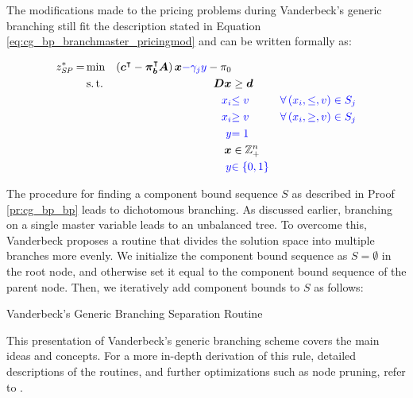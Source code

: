 \begin{note}
The modifications made to the pricing problems during Vanderbeck's generic branching still fit the description stated in Equation \eqref{eq:cg_bp_branchmaster_pricingmod} and can be written formally as:

\begin{equation}
\begin{aligned}
z^*_\SP{} = &\min & \left( \vec{c}\transpose - \vec{\pi}_\vec{b}\transpose \mat{A} \right) \vec{x} {\color{blue} - \gamma_j y} - \pi_0 & \\
&\st & \mat{D} \vec{x} & \geq \vec{d} \\
&& {\color{blue} x_i} & {\color{blue} \leq v} & {\color{blue} \forall \left( x_i, \leq, v \right) \in S_j} \\
&& {\color{blue} x_i} & {\color{blue} \geq v} & {\color{blue} \forall \left( x_i, \geq, v \right) \in S_j} \\
&& {\color{blue} y} & {\color{blue} = 1} \\
&& \vec{x} & \in \mathbb{Z}_+^n \\
&& {\color{blue} y} & {\color{blue} \in \{0, 1\}}
\end{aligned}
\end{equation}
\end{note}

The procedure for finding a component bound sequence $S$ as described in Proof \ref{pr:cg_bp_bp} leads to dichotomous branching. As discussed earlier, branching on a single master variable leads to an unbalanced tree. To overcome this, Vanderbeck proposes a routine that divides the solution space into multiple branches more evenly. We initialize the component bound sequence as $S = \emptyset$ in the root node, and otherwise set it equal to the component bound sequence of the parent node. Then, we iteratively add component bounds to $S$ as follows:

\begin{algorithm}
\caption{Vanderbeck's Generic Branching Separation Routine}
\end{algorithm}

This presentation of Vanderbeck's generic branching scheme covers the main ideas and concepts. For a more in-depth derivation of this rule, detailed descriptions of the routines, and further optimizations such as node pruning, refer to \cite{vanderbeck1996exact, vanderbeck2010reformulation, vanderbeck2011branching, schmickerath2012experiments}.
